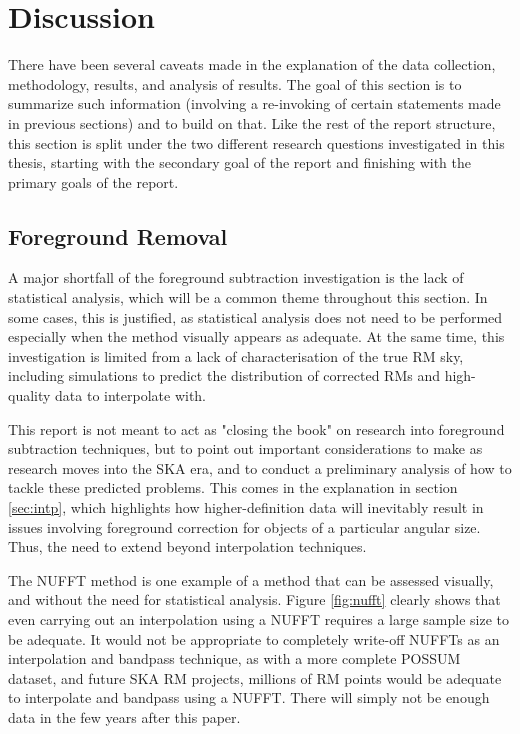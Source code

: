 \chapter{Discussion}
\label{cha:discussion}

There have been several caveats made in the explanation of the data collection, methodology, results, and analysis of results. The goal of this section is to summarize such information (involving a re-invoking of certain statements made in previous sections) and to build on that. Like the rest of the report structure, this section is split under the two different research questions investigated in this thesis, starting with the secondary goal of the report and finishing with the primary goals of the report.

\section{Foreground Removal}
\label{sec:fr_disc}

A major shortfall of the foreground subtraction investigation is the lack of statistical analysis, which will be a common theme throughout this section. In some cases, this is justified, as statistical analysis does not need to be performed especially when the method visually appears as adequate. At the same time, this investigation is limited from a lack of characterisation of the true RM sky, including simulations to predict the distribution of corrected RMs and high-quality data to interpolate with.


This report is not meant to act as "closing the book" on research into foreground subtraction techniques, but to point out important considerations to make as research moves into the SKA era, and to conduct a preliminary analysis of how to tackle these predicted problems. This comes in the explanation in section \ref{sec:intp}, which highlights how higher-definition data will inevitably result in issues involving foreground correction for objects of a particular angular size. Thus, the need to extend beyond interpolation techniques.


The NUFFT method is one example of a method that can be assessed visually, and without the need for statistical analysis. Figure \ref{fig:nufft} clearly shows that even carrying out an interpolation using a NUFFT requires a large sample size to be adequate. It would not be appropriate to completely write-off NUFFTs as an interpolation and bandpass technique, as with a more complete POSSUM dataset, and future SKA RM projects, millions of RM points would be adequate to interpolate and bandpass using a NUFFT. There will simply not be enough data in the few years after this paper.


